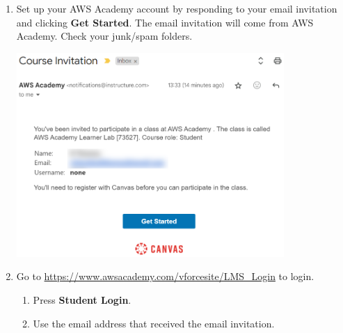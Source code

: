 \begin{enumerate}
    \item
        Set up your AWS Academy account by responding to your email invitation and clicking \textbf{Get Started}.
        The email invitation will come from AWS Academy.
        Check your junk/spam folders.

        \includegraphics[width=0.8\textwidth]{images/email-invite}

    \item Go to \url{https://www.awsacademy.com/vforcesite/LMS_Login} to login.
    \begin{enumerate}
        \item Press \textbf{Student Login}.
        \item Use the email address that received the email invitation.
    \end{enumerate}


\end{enumerate}
